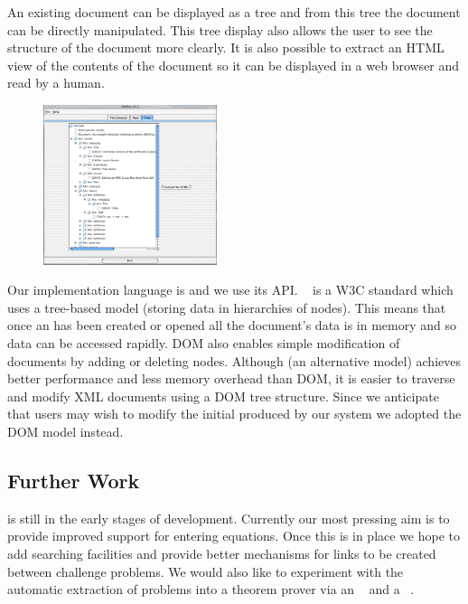 An existing document can be displayed as a tree and from this tree the document can be
directly manipulated. This tree display also allows the user to see the structure of the
document more clearly.  It is also possible to extract an HTML view of the contents of the
document so it can be displayed in a web browser and read by a human.

\begin{figure}
  \includegraphics[width=2in]{projects/induction-challenge/treeview}
\end{figure}
Our implementation language is {\java} and we use its {} API.
{}~\cite{URL:DOM} is a W3C standard which uses a tree-based model (storing
data in hierarchies of nodes).  This means that once an {\omdoc} has been created or
opened all the document's data is in memory and so data can be accessed rapidly. DOM also
enables simple modification of documents by adding or deleting nodes.  Although {\sax} (an
alternative model) achieves better performance and less memory overhead than DOM, it is
easier to traverse and modify XML documents using a DOM tree structure.  Since we
anticipate that users may wish to modify the initial {\omdoc} produced by our system we
adopted the DOM model instead.

\subsection{Further Work} {} is still in the early stages of development.
Currently our most pressing aim is to provide improved support for entering equations.
Once this is in place we hope to add searching facilities and provide better mechanisms
for links to be created between challenge problems.  We would also like to experiment with
the automatic extraction of problems into a theorem prover via an
{\mbase}~\cite{KohlhaseFranke00} and a {\mathweb}~\cite{MathWeb99}.


